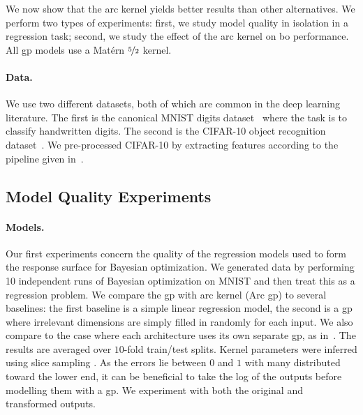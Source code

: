 \documentclass{article}
\newcommand{\bo}{{\sc bo}}
\newcommand{\gp}{{\sc gp}}
\newcommand{\agp}{Arc \gp}
\begin{document}
We now show that the arc kernel yields better results than other alternatives. 
We perform two types of experiments: first, we study model quality in isolation in a regression task; second, we study the effect of the arc kernel on \bo{} performance. All \gp{} models use a Mat\'{e}rn $\nicefrac{5}{2}$ kernel.

\paragraph{Data.} We use two different datasets, both of which are common in the deep learning literature. The first is the canonical MNIST digits dataset~\cite{lecun-1998a} where the task is to classify handwritten digits. The second is the CIFAR-10 object recognition dataset~\cite{Krizhevsky-2009a}. We pre-processed CIFAR-10 by extracting features according to the pipeline given in~\cite{coates2010analysis}.

\subsection{Model Quality Experiments}   

\paragraph{Models.}

Our first experiments concern the quality of the regression models used to form the response surface for Bayesian optimization. We generated data by performing 10 independent runs of Bayesian optimization on MNIST and then treat this as a regression problem. We compare the \gp{} with arc kernel (\agp) to several baselines: the first baseline is a simple linear regression model, the second is a \gp{}  where irrelevant dimensions are simply filled in randomly for each input. We also compare to the case where each architecture uses its own separate \gp{}, as in~\cite{bergstra2011algorithms}. The results are averaged over $10$-fold train/test splits. Kernel parameters were inferred using slice sampling \cite{Murray-Adams-2010a}. As the errors lie between $0$ and $1$ with many distributed toward the lower end, it can be beneficial to take the log of the outputs before modelling them with a \gp{}. We experiment with both the original and transformed outputs.
\end{document}

